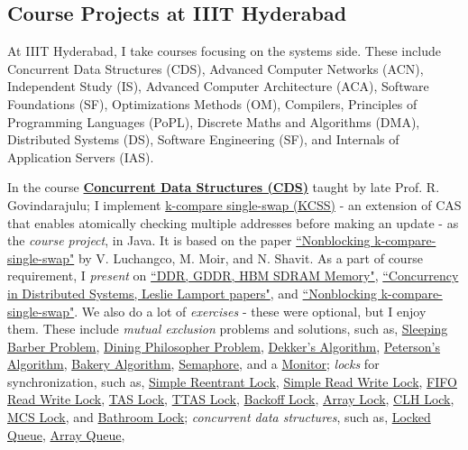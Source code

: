 \subsection{Course Projects at IIIT Hyderabad}

At IIIT Hyderabad, I take courses focusing on the systems side. These include Concurrent Data Structures (CDS), Advanced Computer Networks (ACN), Independent Study (IS), Advanced Computer Architecture (ACA), Software Foundations (SF), Optimizations Methods (OM), Compilers, Principles of Programming Languages (PoPL), Discrete Maths and Algorithms (DMA), Distributed Systems (DS), Software Engineering (SF), and Internals of Application Servers (IAS).

In the course \textbf{\href{https://github.com/iiithf/concurrent-data-structures}{Concurrent Data Structures (CDS)}} taught by late Prof. R. Govindarajulu; I implement \href{https://github.com/javaf/k-compare-single-swap}{k-compare single-swap (KCSS)} - an extension of CAS that enables atomically checking multiple addresses before making an update - as the \textit{course project}, in Java. It is based on the paper \href{https://dl.acm.org/doi/10.1145/777412.777468}{``Nonblocking k-compare-single-swap"} by V. Luchangco, M. Moir, and N. Shavit. As a part of course requirement, I \textit{present} on \href{https://gist.github.com/wolfram77/28da72ab511eacafbd55f3576fb03019}{``DDR, GDDR, HBM SDRAM Memory"}, \href{https://gist.github.com/wolfram77/3507129650f2e56e00da013a7de93ddb}{``Concurrency in Distributed Systems, Leslie Lamport papers"}, and \href{https://gist.github.com/wolfram77/77758eb9f7d393598fc142d9559e5a5e}{``Nonblocking k-compare-single-swap"}. We also do a lot of \textit{exercises} - these were optional, but I enjoy them. These include \textit{mutual exclusion} problems and solutions, such as, \href{https://github.com/javaf/sleeping-barber-problem}{Sleeping Barber Problem}, \href{https://github.com/javaf/dining-philosophers-problem}{Dining Philosopher Problem}, \href{https://github.com/javaf/dekker-algorithm}{Dekker's Algorithm}, \href{https://github.com/javaf/peterson-algorithm}{Peterson's Algorithm}, \href{https://github.com/javaf/bakery-algorithm}{Bakery Algorithm}, \href{https://github.com/javaf/simple-semaphore}{Semaphore}, and a \href{https://github.com/javaf/monitor-example}{Monitor}; \textit{locks} for synchronization, such as, \href{https://github.com/javaf/simple-reentrant-lock}{Simple Reentrant Lock}, \href{https://github.com/javaf/simple-read-write-lock}{Simple Read Write Lock}, \href{https://github.com/javaf/fifo-read-write-lock}{FIFO Read Write Lock}, \href{https://github.com/javaf/tas-lock}{TAS Lock}, \href{https://github.com/javaf/ttas-lock}{TTAS Lock}, \href{https://github.com/javaf/backoff-lock}{Backoff Lock}, \href{https://github.com/javaf/array-lock}{Array Lock}, \href{https://github.com/javaf/clh-lock}{CLH Lock}, \href{https://github.com/javaf/mcs-lock}{MCS Lock}, and \href{https://github.com/javaf/bathroom-lock}{Bathroom Lock}; \textit{concurrent data structures}, such as, \href{https://github.com/javaf/locked-queue}{Locked Queue}, \href{https://github.com/javaf/array-queue}{Array Queue}, 
